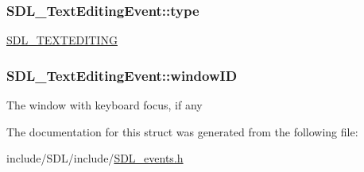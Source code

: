 \hypertarget{struct_s_d_l___text_editing_event_a198e6df194a3bf12cf5f82553e84c7cb}{
\subsubsection[{type}]{ S\-D\-L\-\_\-\-Text\-Editing\-Event\-::type}}\label{struct_s_d_l___text_editing_event_a198e6df194a3bf12cf5f82553e84c7cb}
\hyperlink{_s_d_l__events_8h_a3b589e89be6b35c02e0dd34a55f3fccaa1b80c465df69c0b6d06f026ce7a230e3}{S\-D\-L\-\_\-\-T\-E\-X\-T\-E\-D\-I\-T\-I\-N\-G} \hypertarget{struct_s_d_l___text_editing_event_a23b3e414cf7a7ccc547b7595ca930049}{
\subsubsection[{window\-I\-D}]{ S\-D\-L\-\_\-\-Text\-Editing\-Event\-::window\-I\-D}}\label{struct_s_d_l___text_editing_event_a23b3e414cf7a7ccc547b7595ca930049}
The window with keyboard focus, if any 

The documentation for this struct was generated from the following file\-:\begin{DoxyCompactItemize}
\item 
include/\-S\-D\-L/include/\hyperlink{_s_d_l__events_8h}{S\-D\-L\-\_\-events.\-h}\end{DoxyCompactItemize}
